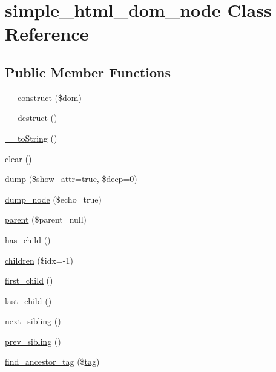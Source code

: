 \hypertarget{classsimple__html__dom__node}{\section{simple\+\_\+html\+\_\+dom\+\_\+node Class Reference}
\label{classsimple__html__dom__node}
}
\subsection*{Public Member Functions}
\begin{DoxyCompactItemize}
\item 
\hyperlink{classsimple__html__dom__node_aac23fa1150ef19e7f28c0cf2d9e31086}{\+\_\+\+\_\+construct} (\$dom)
\item 
\hyperlink{classsimple__html__dom__node_a421831a265621325e1fdd19aace0c758}{\+\_\+\+\_\+destruct} ()
\item 
\hyperlink{classsimple__html__dom__node_a7516ca30af0db3cdbf9a7739b48ce91d}{\+\_\+\+\_\+to\+String} ()
\item 
\hyperlink{classsimple__html__dom__node_aa821bec12eaa7e0f649397c9675ff505}{clear} ()
\item 
\hyperlink{classsimple__html__dom__node_ad15ceec0aa0d3e1c5ca8c7bd6aebe80b}{dump} (\$show\+\_\+attr=true, \$deep=0)
\item 
\hyperlink{classsimple__html__dom__node_a38121751fa4d30226afcf3011e596f5e}{dump\+\_\+node} (\$echo=true)
\item 
\hyperlink{classsimple__html__dom__node_a3e5906e2b6a1b4338f3e59d818657b08}{parent} (\$parent=null)
\item 
\hyperlink{classsimple__html__dom__node_abcbaf3b1869134816ac74a07ee2242f1}{has\+\_\+child} ()
\item 
\hyperlink{classsimple__html__dom__node_a42d02529839611cba362c6b5ce58f719}{children} (\$idx=-\/1)
\item 
\hyperlink{classsimple__html__dom__node_ade851eb21476ec16857ed56d166f6afc}{first\+\_\+child} ()
\item 
\hyperlink{classsimple__html__dom__node_a97160a76243a59b48b26e6d96b07b6ea}{last\+\_\+child} ()
\item 
\hyperlink{classsimple__html__dom__node_ade0fb39187948a5a6772dfc30252f8f8}{next\+\_\+sibling} ()
\item 
\hyperlink{classsimple__html__dom__node_acea92e7c0be16e44d15cc502cec229d8}{prev\+\_\+sibling} ()
\item 
\hyperlink{classsimple__html__dom__node_a03d7c0efb45d013cc1421612c719e867}{find\+\_\+ancestor\+\_\+tag} (\$\hyperlink{element__testcase_8php_a18413934cd1931907ddc5ac04031be0a}{tag})

\end{DoxyCompactItemize}
